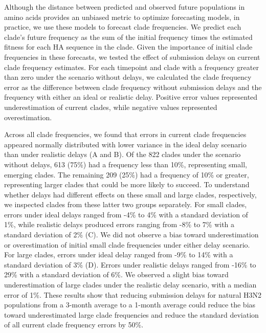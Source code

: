 \documentclass[9pt,lineno]{elife}
\begin{document}
Although the distance between predicted and observed future populations in amino acids provides an unbiased metric to optimize forecasting models, in practice, we use these models to forecast clade frequencies.
We predict each clade's future frequency as the sum of the initial frequency times the estimated fitness for each HA sequence in the clade.
Given the importance of initial clade frequencies in these forecasts, we tested the effect of submission delays on current clade frequency estimates.
For each timepoint and clade with a frequency greater than zero under the scenario without delays, we calculated the clade frequency error as the difference between clade frequency without submission delays and the frequency with either an ideal or realistic delay.
Positive error values represented underestimation of current clades, while negative values represented overestimation.

Across all clade frequencies, we found that errors in current clade frequencies appeared normally distributed with lower variance in the ideal delay scenario than under realistic delays (A and B).
Of the 822 clades under the scenario without delays, 613 (75\%) had a frequency less than 10\%, representing small, emerging clades.
The remaining 209 (25\%) had a frequency of 10\% or greater, representing larger clades that could be more likely to succeed.
To understand whether delays had different effects on these small and large clades, respectively, we inspected clades from these latter two groups separately.
For small clades, errors under ideal delays ranged from -4\% to 4\% with a standard deviation of 1\%, while realistic delays produced errors ranging from -8\% to 7\% with a standard deviation of 2\% (C).
We did not observe a bias toward underestimation or overestimation of initial small clade frequencies under either delay scenario.
For large clades, errors under ideal delay ranged from -9\% to 14\% with a standard deviation of 3\% (D).
Errors under realistic delays ranged from -16\% to 29\% with a standard deviation of 6\%.
We observed a slight bias toward underestimation of large clades under the realistic delay scenario, with a median error of 1\%.
These results show that reducing submission delays for natural H3N2 populations from a 3-month average to a 1-month average could reduce the bias toward underestimated large clade frequencies and reduce the standard deviation of all current clade frequency errors by 50\%.
\end{document}
